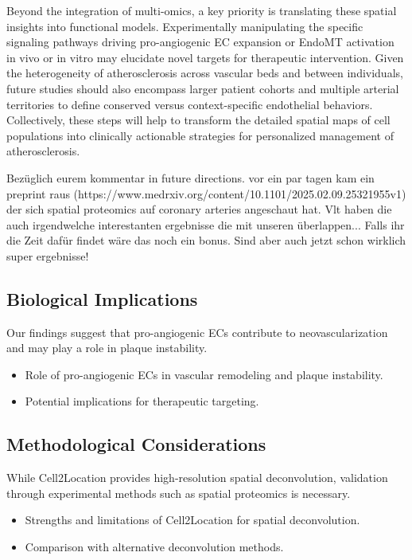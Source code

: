 \documentclass[a4paper,12pt]{article}
\begin{document}
Beyond the integration of multi-omics, a key priority is translating these spatial insights into functional models. Experimentally manipulating the specific signaling pathways driving pro-angiogenic EC expansion or EndoMT activation in vivo or in vitro may elucidate novel targets for therapeutic intervention. Given the heterogeneity of atherosclerosis across vascular beds and between individuals, future studies should also encompass larger patient cohorts and multiple arterial territories to define conserved versus context-specific endothelial behaviors. Collectively, these steps will help to transform the detailed spatial maps of cell populations into clinically actionable strategies for personalized management of atherosclerosis.

Bezüglich eurem kommentar in future directions. vor ein par tagen kam ein preprint raus (https://www.medrxiv.org/content/10.1101/2025.02.09.25321955v1) der sich spatial proteomics auf coronary arteries angeschaut hat. Vlt haben die auch irgendwelche interestanten ergebnisse die mit unseren überlappen... Falls ihr die Zeit dafür findet wäre das noch ein bonus. Sind aber auch jetzt schon wirklich super ergebnisse!

\subsection{Biological Implications}
Our findings suggest that pro-angiogenic ECs contribute to neovascularization and may play a role in plaque instability.

\begin{itemize}
  \item Role of pro-angiogenic ECs in vascular remodeling and plaque instability.
  \item Potential implications for therapeutic targeting.
\end{itemize}

\subsection{Methodological Considerations}
While Cell2Location provides high-resolution spatial deconvolution, validation through experimental methods such as spatial proteomics is necessary.

\begin{itemize}
  \item Strengths and limitations of Cell2Location for spatial deconvolution.
  \item Comparison with alternative deconvolution methods.
\end{itemize}
\end{document}
